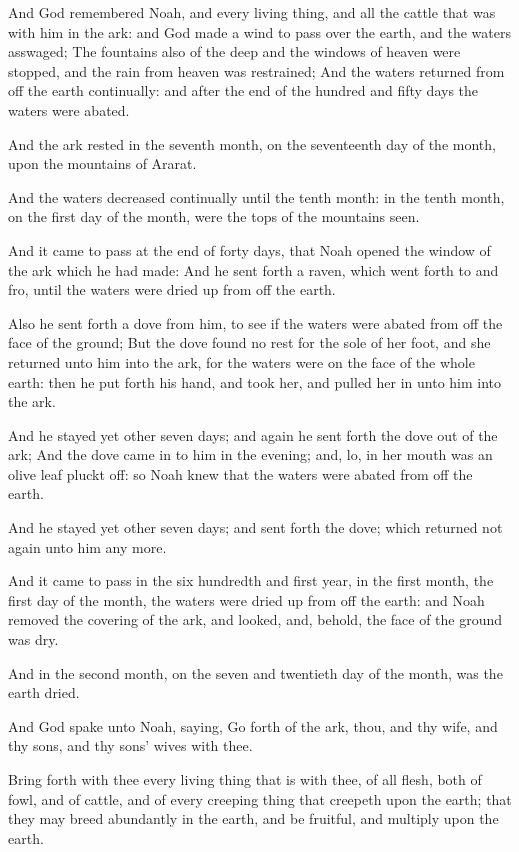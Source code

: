 \verse And God remembered Noah, and every living thing, and all the cattle that was with him in the ark: and God made a wind to pass over the earth, and the waters asswaged; \verse The fountains also of the deep and the windows of heaven were stopped, and the rain from heaven was restrained; \verse And the waters returned from off the earth continually: and after the end of the hundred and fifty days the waters were abated.

\verse And the ark rested in the seventh month, on the seventeenth day of the month, upon the mountains of Ararat.

\verse And the waters decreased continually until the tenth month: in the tenth month, on the first day of the month, were the tops of the mountains seen.

\verse And it came to pass at the end of forty days, that Noah opened the window of the ark which he had made: \verse And he sent forth a raven, which went forth to and fro, until the waters were dried up from off the earth.

\verse Also he sent forth a dove from him, to see if the waters were abated from off the face of the ground; \verse But the dove found no rest for the sole of her foot, and she returned unto him into the ark, for the waters were on the face of the whole earth: then he put forth his hand, and took her, and pulled her in unto him into the ark.

\verse And he stayed yet other seven days; and again he sent forth the dove out of the ark; \verse And the dove came in to him in the evening; and, lo, in her mouth was an olive leaf pluckt off: so Noah knew that the waters were abated from off the earth.

\verse And he stayed yet other seven days; and sent forth the dove; which returned not again unto him any more.

\verse And it came to pass in the six hundredth and first year, in the first month, the first day of the month, the waters were dried up from off the earth: and Noah removed the covering of the ark, and looked, and, behold, the face of the ground was dry.

\verse And in the second month, on the seven and twentieth day of the month, was the earth dried.

\verse And God spake unto Noah, saying, \verse Go forth of the ark, thou, and thy wife, and thy sons, and thy sons' wives with thee.

\verse Bring forth with thee every living thing that is with thee, of all flesh, both of fowl, and of cattle, and of every creeping thing that creepeth upon the earth; that they may breed abundantly in the earth, and be fruitful, and multiply upon the earth.

